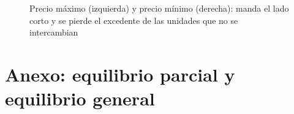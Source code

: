 \documentclass[11pt]{article}
\begin{document}
\begin{figure}[H]
\centering
\caption{Precio máximo (izquierda) y precio mínimo (derecha): manda el lado corto y se pierde el excedente de las unidades que no se intercambian}\label{fig:controles-precios}
\end{figure}

\section{Anexo: equilibrio parcial y equilibrio general}\label{anexo:parcial-general}
\end{document}
